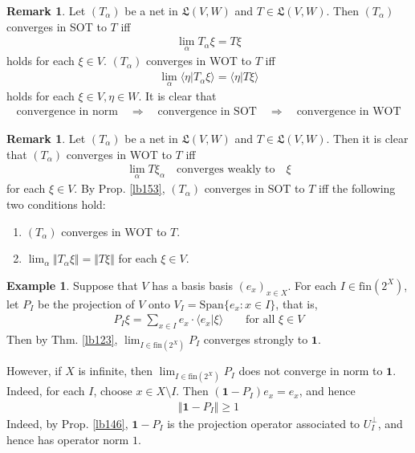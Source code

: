 \documentclass[12pt,b5paper,notitlepage]{article}
\theoremstyle{definition}
\newtheorem{eg}[df]{Example}
\newtheorem{rem}[df]{Remark}
\theoremstyle{plain}
\newcommand{\fk}{\mathfrak}
\newcommand{\idt}{\mathbf{1}}
\newcommand{\Span}{\mathrm{Span}}
\newcommand{\bk}[1]{\langle {#1}\rangle}
\newcommand{\fin}{\mathrm{fin}}
\newcommand{\hqed}{\hfill\qedsymbol}
\numberwithin{equation}{section}
\begin{document}
\begin{rem}
Let $(T_\alpha)$ be a net in $\fk L(V,W)$ and $T\in\fk L(V,W)$. Then $(T_\alpha)$ converges in SOT to $T$ iff
\begin{align}
\lim_\alpha T_\alpha\xi=T\xi
\end{align}
holds for each $\xi\in V$. $(T_\alpha)$ converges in WOT to $T$ iff
\begin{align}
\lim_\alpha \bk{\eta|T_\alpha\xi}=\bk{\eta|T\xi}
\end{align}
holds for each $\xi\in V,\eta\in W$. It is clear that
\begin{align*}
\text{convergence in norm}\quad\Rightarrow\quad\text{convergence in SOT}\quad\Rightarrow\quad\text{convergence in WOT}
\end{align*}
\end{rem}


\begin{rem}\label{lb241}
Let $(T_\alpha)$ be a net in $\fk L(V,W)$ and $T\in\fk L(V,W)$. Then it is clear that $(T_\alpha)$ converges in WOT to $T$ iff
\begin{align*}
\lim_\alpha T\xi_\alpha\quad\text{converges weakly to}\quad\xi
\end{align*}
for each $\xi\in V$. By Prop. \ref{lb153}, $(T_\alpha)$ converges in SOT to $T$ iff the following two conditions hold:
\begin{enumerate}[label=(\arabic*)]
\item $(T_\alpha)$ converges in WOT to $T$.
\item $\lim_\alpha \Vert T_\alpha\xi\Vert=\Vert T\xi\Vert$ for each $\xi\in V$.
\end{enumerate}
\end{rem}


\begin{eg}\label{lb157}
Suppose that $V$ has a basis basis $(e_x)_{x\in X}$. For each $I\in\fin(2^X)$, let $P_I$ be the projection of $V$ onto $V_I=\Span\{e_x:x\in I\}$, that is,
\begin{align*}
P_I\xi=\sum_{x\in I}e_x\cdot\bk{e_x|\xi}\qquad\text{for all }\xi\in V
\end{align*}
Then by Thm. \ref{lb123}, $\lim_{I\in\fin(2^X)}P_I$ converges strongly to $\idt$. 

However, if $X$ is infinite, then $\lim_{I\in\fin(2^X)}P_I$ does not converge in norm to $\idt$. Indeed, for each $I$, choose $x\in X\setminus I$. Then $(\idt-P_I)e_x=e_x$, and hence
\begin{align*}
\Vert\idt-P_I\Vert\geq 1
\end{align*}
Indeed, by Prop. \ref{lb146}, $\idt-P_I$ is the projection operator associated to $U_I^\perp$, and hence has operator norm $1$.  \hqed
\end{eg}
\end{document}
